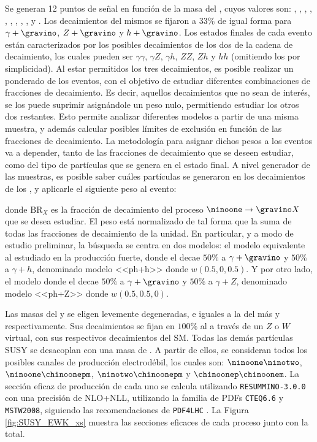 Se generan 12 puntos de señal en función de la masa del \ninoone, cuyos valores son: , , , , , , , , ,  y . Los decaimientos del mismos se fijaron a $33\%$ de igual forma para $\gamma + \gravino$, $Z + \gravino$ y $h + \gravino$. Los estados finales de cada evento están caracterizados por los posibles decaimientos de los dos \ninoone de la cadena de decaimiento, los cuales pueden ser $\gamma\gamma$, $\gamma Z$, $\gamma h$, $ZZ$, $Zh$ y $hh$ (omitiendo los \gravino por simplicidad). Al estar permitidos los tres decaimientos, es posible realizar un ponderado de los eventos, con el objetivo de estudiar diferentes combinaciones de fracciones de decaimiento. Es decir, aquellos decaimientos que no sean de interés, se los puede suprimir asignándole un peso nulo, permitiendo estudiar los otros dos restantes. Esto permite analizar diferentes modelos a partir de una misma muestra, y además calcular posibles límites de exclusión en función de las fracciones de decaimiento.
La metodología para asignar dichos pesos a los eventos va a depender, tanto de las fracciones de decaimiento que se deseen estudiar, como del tipo de partículas que se genera en el estado final. A nivel generador de las muestras, es posible saber cuáles partículas se generaron en los decaimientos de los \ninoone, y aplicarle el siguiente peso al evento:



donde $\text{BR}_{X}$ es la fracción de decaimiento del proceso $\ninoone \to \gravino X$ que se desea estudiar.
El peso está normalizado de tal forma que la suma de todas las fracciones de decaimiento de la unidad. En particular, y a modo de estudio preliminar, la búsqueda se centra en dos modelos: el modelo equivalente al estudiado en la producción fuerte, donde el \ninoone decae $50\%$ a $\gamma + \gravino$ y $50\%$ a $\gamma + h$, denominado modelo <<ph+h>> donde $w(0.5, 0, 0.5)$. Y por otro lado, el modelo donde el \ninoone decae $50\%$ a $\gamma + \gravino$ y $50\%$ a $\gamma + Z$, denominado modelo <<ph+Z>> donde $w(0.5, 0.5, 0)$.

Las masas del \ninotwo y \chinopm se eligen levemente degeneradas, e iguales a la del \ninoone más  y  respectivamente. 
Sus decaimientos se fijan en $100\%$ al \ninoone a través de un $Z$ o $W$ virtual, con sus respectivos decaimientos del SM. Todas las demás partículas SUSY se desacoplan con una masa de . A partir de ellos, se consideran todos los posibles canales de producción electrodébil, los cuales son: $\ninoone \ninotwo$, $\ninoone \chinoonepm$, $\ninotwo \chinoonepm$ y $\chinoonep \chinoonem$. La sección eficaz de producción de cada uno se calcula utilizando \texttt{RESUMMINO-3.0.0} \cite{Beenakker:1999xh,Debove:2010kf,Fuks:2012qx,Fuks:2013vua,Fiaschi:2018hgm} con una precisión de NLO+NLL, utilizando la familia de PDFs \texttt{CTEQ6.6} y \texttt{MSTW2008}, siguiendo las recomendaciones de \texttt{PDF4LHC} \cite{Butterworth:2015oua}. La Figura \ref{fig:SUSY_EWK_xs} muestra las secciones eficaces de cada proceso junto con la total.



